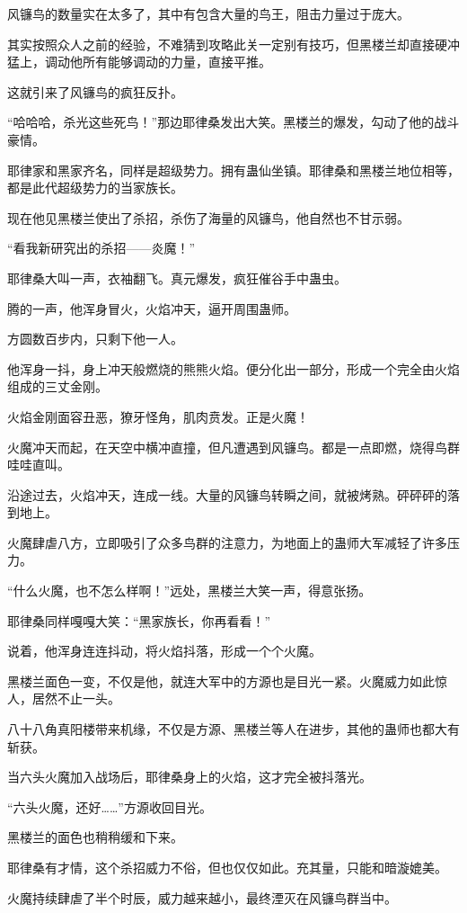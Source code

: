 \begin{this_body}
风镰鸟的数量实在太多了，其中有包含大量的鸟王，阻击力量过于庞大。

其实按照众人之前的经验，不难猜到攻略此关一定别有技巧，但黑楼兰却直接硬冲猛上，调动他所有能够调动的力量，直接平推。

这就引来了风镰鸟的疯狂反扑。

“哈哈哈，杀光这些死鸟！”那边耶律桑发出大笑。黑楼兰的爆发，勾动了他的战斗豪情。

耶律家和黑家齐名，同样是超级势力。拥有蛊仙坐镇。耶律桑和黑楼兰地位相等，都是此代超级势力的当家族长。

现在他见黑楼兰使出了杀招，杀伤了海量的风镰鸟，他自然也不甘示弱。

“看我新研究出的杀招——炎魔！”

耶律桑大叫一声，衣袖翻飞。真元爆发，疯狂催谷手中蛊虫。

腾的一声，他浑身冒火，火焰冲天，逼开周围蛊师。

方圆数百步内，只剩下他一人。

他浑身一抖，身上冲天般燃烧的熊熊火焰。便分化出一部分，形成一个完全由火焰组成的三丈金刚。

火焰金刚面容丑恶，獠牙怪角，肌肉贲发。正是火魔！

火魔冲天而起，在天空中横冲直撞，但凡遭遇到风镰鸟。都是一点即燃，烧得鸟群哇哇直叫。

沿途过去，火焰冲天，连成一线。大量的风镰鸟转瞬之间，就被烤熟。砰砰砰的落到地上。

火魔肆虐八方，立即吸引了众多鸟群的注意力，为地面上的蛊师大军减轻了许多压力。

“什么火魔，也不怎么样啊！”远处，黑楼兰大笑一声，得意张扬。

耶律桑同样嘎嘎大笑：“黑家族长，你再看看！”

说着，他浑身连连抖动，将火焰抖落，形成一个个火魔。

黑楼兰面色一变，不仅是他，就连大军中的方源也是目光一紧。火魔威力如此惊人，居然不止一头。

八十八角真阳楼带来机缘，不仅是方源、黑楼兰等人在进步，其他的蛊师也都大有斩获。

当六头火魔加入战场后，耶律桑身上的火焰，这才完全被抖落光。

“六头火魔，还好……”方源收回目光。

黑楼兰的面色也稍稍缓和下来。

耶律桑有才情，这个杀招威力不俗，但也仅仅如此。充其量，只能和暗漩媲美。

火魔持续肆虐了半个时辰，威力越来越小，最终湮灭在风镰鸟群当中。


\end{this_body}
